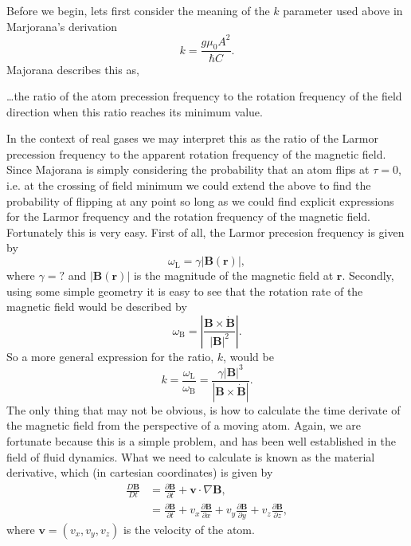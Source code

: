 Before we begin, lets first consider the meaning of the $k$ parameter used above in Marjorana's derivation
\begin{equation}
    k = \frac{g \mu_{0} A^2} {\hbar C}.
\end{equation}
Majorana describes this as, 
\begin{displayquote}
    \dots the ratio of the atom precession frequency to the rotation frequency of the field direction when this ratio reaches its minimum value.
\end{displayquote}
In the context of real gases we may interpret this as the ratio of the Larmor precession frequency to the apparent rotation frequency of the magnetic field.
Since Majorana is simply considering the probability that an atom flips at $\tau = 0$, i.e. at the crossing of field minimum we could extend the above to find the probability of flipping at any point so long as we could find explicit expressions for the Larmor frequency and the rotation frequency of the magnetic field.
Fortunately this is very easy.
First of all, the Larmor precesion frequency is given by
\begin{equation}
    \omega_{\textrm{L}} = \gamma \vert \mathbf{B}(\mathbf{r}) \vert,
\end{equation}
where $\gamma = ?$ and $\vert \mathbf{B}(\mathbf{r}) \vert$ is the magnitude of the magnetic field at $\mathbf{r}$.
Secondly, using some simple geometry it is easy to see that the rotation rate of the magnetic field would be described by
\begin{equation}
    \omega_\mathrm{B} = \left \vert \frac{\mathbf{B} \times \dot{ \mathbf{B} } } { \left \vert \mathbf{B} \right \vert ^ 2} \right \vert.
\end{equation}
So a more general expression for the ratio, $k$, would be
\begin{equation}
    k = \frac{\omega_\textrm{L}}{\omega_\textrm{B}} = \frac{\gamma \left\vert \mathbf{B} \right\vert^3}{\left\vert \mathbf{B} \times \dot{ \mathbf{B} }\right \vert }.
\end{equation}
The only thing that may not be obvious, is how to calculate the time derivate of the magnetic field from the perspective of a moving atom.
Again, we are fortunate because this is a simple problem, and has been well established in the field of fluid dynamics.
What we need to calculate is known as the material derivative, which (in cartesian coordinates) is given by
\begin{align}
    \frac{D \mathbf{B}}{Dt} &= \frac{\partial \mathbf{B}}{\partial t} + \mathbf{v} \cdot \nabla \mathbf{B},\\
    &= \frac{\partial \mathbf{B}}{\partial t} + v_x  \frac{\partial \mathbf{B}}{\partial x} + v_y \frac{\partial \mathbf{B}}{\partial y} + v_z \frac{\partial \mathbf{B}}{\partial z},
\end{align}
where $\mathbf{v} = \left(v_x,v_y,v_z\right)$ is the velocity of the atom.





